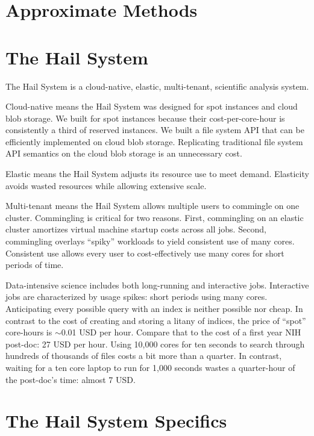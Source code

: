 \documentclass[10pt,a4paper%
]{article}
\begin{document}
\section{Approximate Methods}

\section{The Hail System}

The Hail System is a cloud-native, elastic, multi-tenant, scientific analysis system.

Cloud-native means the Hail System was designed for spot instances and cloud blob storage.
We built for spot instances because their cost-per-core-hour is consistently a third of reserved instances.
We built a file system API that can be efficiently implemented on cloud blob storage.
Replicating traditional file system API semantics on the cloud blob storage is an unnecessary cost.

Elastic means the Hail System adjusts its resource use to meet demand.
Elasticity avoids wasted resources while allowing extensive scale.

Multi-tenant means the Hail System allows multiple users to commingle on one cluster.
Commingling is critical for two reasons.
First, commingling on an elastic cluster amortizes virtual machine startup costs across all jobs.
Second, commingling overlays ``spiky'' workloads to yield consistent use of many cores.
Consistent use allows every user to cost-effectively use many cores for short periods of time.

Data-intensive science includes both long-running and interactive jobs.
Interactive jobs are characterized by usage spikes: short periods using many cores.
Anticipating every possible query with an index is neither possible nor cheap.
In contrast to the cost of creating and storing a litany of indices, the price of ``spot'' core-hours is $\sim$0.01 USD per hour.
Compare that to the cost of a first year NIH post-doc: 27 USD per hour.
Using 10,000 cores for ten seconds to search through hundreds of thousands of files costs a bit more than a quarter.
In contrast, waiting for a ten core laptop to run for 1,000 seconds wastes a quarter-hour of the post-doc's time: almost 7 USD.


\section{The Hail System Specifics}
\end{document}
